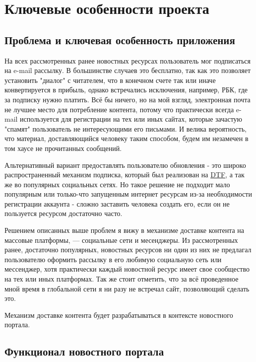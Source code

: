   \section{Ключевые особенности проекта}

  \subsection{Проблема и ключевая особенность приложения}

  На всех рассмотренных ранее новостных ресурсах пользователь мог подписаться на e-mail рассылку. В большинстве случаев это бесплатно, так как это позволяет установить "диалог" с читателем, что в конечном счете так или иначе конвертируется в прибыль, однако встречались исключения, например, РБК, где за подписку нужно платить. Всё бы ничего, но на мой взгляд, электронная почта не лучшее место для потребление контента, потому что практически всегда e-mail используется для регистрации на тех или иных сайтах, которые зачастую "спамят"  пользователь не интересующими его письмами. И велика вероятность, что материал, доставляющийся человеку таким способом, будем им незамечен в том хаусе не прочитанных сообщений.

  Альтернативный вариант предоставлять пользователю обновления - это широко распространенный механизм подписка, который был реализован на \href{http://dtf.ru}{DTF}, а так же во популярных социальных сетях. Но такое решение не подходит мало популярным или только-что запущенным интернет ресурсам из-за необходимости регистрации аккаунта - сложно заставить человека создать его, если он не пользуется ресурсом достаточно часто.

  Решением описанных выше проблем я вижу в механизме доставке контента на массовые платформы, --- социальные сети и месенджеры. Из рассмотренных ранее, достаточно популярных, новостных ресурсов ни один из них не предлагал пользователю оформить рассылку в его любимую социальную сеть или мессенджер, хотя практически каждый новостной ресурс имеет свое сообщество на тех или иных платформах. Так же стоит отметить, что за всё проведенное мной время в глобальной сети я ни разу не встречал сайт, позволяющий сделать это.

  Механизм доставке контента будет разрабатываться в контексте новостного портала.

  \subsection{Функционал новостного портала}

